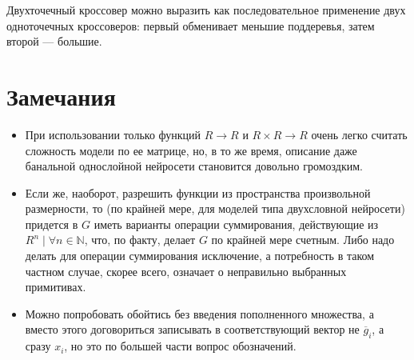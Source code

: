 \documentclass[12pt,a4paper]{amsart}
\begin{document}
Двухточечный кроссовер можно выразить как последовательное применение двух одноточечных кроссоверов: первый обменивает
меньшие поддеревья, затем второй --- большие.

\section{Замечания}

\begin{itemize}
  \item При использовании только функций $R \to R$ и $R \times R \to R$ очень легко считать сложность модели по ее
	матрице, но, в то же время, описание даже банальной однослойной нейросети становится довольно громоздким.
  \item Если же, наоборот, разрешить функции из пространства произвольной размерности, то (по крайней мере, для моделей
	типа двухсловной нейросети) придется в $G$ иметь варианты операции суммирования, действующие из
	$R^n \mid \forall n \in \mathbb{N}$, что, по факту, делает $G$ по крайней мере счетным. Либо надо делать для
	операции суммирования исключение, а потребность в таком частном случае, скорее всего, означает о неправильно
	выбранных примитивах.
  \item Можно попробовать обойтись без введения пополненного множества, а вместо этого договориться записывать в
	соответствующий вектор не $\overline{g}_i$, а сразу $x_i$, но это по большей части вопрос обозначений.
\end{itemize}


\extrasrussian

\end{document}
